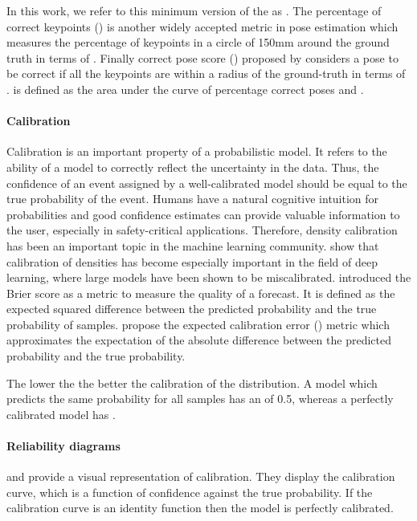 \documentclass{article} \usepackage{iclr2023_conference,times}
\begin{document}
In this work, we refer to this minimum version of the  as .
The percentage of correct keypoints () \citep{Toshev2013-vi, Tompson2014-wh, Mehta2016-ji} is another widely accepted metric in pose estimation which measures the percentage of keypoints in a circle of 150mm around the ground truth in terms of . Finally correct pose score () proposed by \citet{Wandt2021Canonpose} considers a pose to be correct if all the keypoints are within a radius  of the ground-truth in terms of .  is defined as the area under the curve of percentage correct poses and .


\paragraph{Calibration} Calibration is an important property of a probabilistic model.
It refers to the ability of a model to correctly reflect the uncertainty in the data.
Thus, the confidence of an event assigned by a well-calibrated model should be equal to the true probability of the event.
Humans have a natural cognitive intuition for probabilities \citep{Cosmides1996} and good confidence estimates can provide valuable information to the user, especially in safety-critical applications.
Therefore, density calibration has been an important topic in the machine learning community.
\citet{Guo2017-nv} show that calibration of densities has become especially important in the field of deep learning, where large models have been shown to be miscalibrated.
\citet{Brier1950} introduced the Brier score as a metric to measure the quality of a forecast.
It is defined as the expected squared difference between the predicted probability  and the true probability  of  samples.
\citet{Naeini2015} propose the expected calibration error () metric which approximates the expectation of the absolute difference between the predicted probability and the true probability.

The lower the  the better the calibration of the distribution.
A model which predicts the same probability for all samples has an  of 0.5, whereas a perfectly calibrated model has .
\paragraph{Reliability diagrams} \citet{DeGroot1983} and \citet{Niculescu-Mizil2005} provide a visual representation of calibration. They display the calibration curve, which is a function of confidence against the true probability. If the calibration curve is an identity function then the model is perfectly calibrated.
\end{document}
